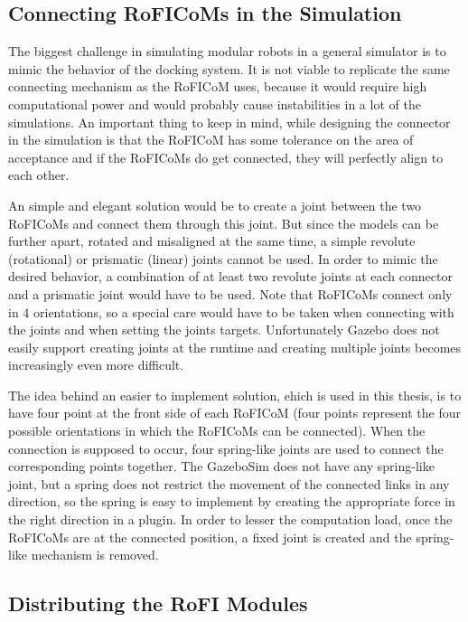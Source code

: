 \documentclass[
  digital, %
  table,   %
  oneside, %
  nolof,     %
  nolot,     %
]{fithesis3}
\begin{document}
\subsection{Connecting RoFICoMs in the Simulation}

The biggest challenge in simulating modular robots in a general simulator is to mimic the behavior of the docking system.
It is not viable to replicate the same connecting mechanism as the RoFICoM uses, because it would require high computational power and would probably cause instabilities in a lot of the simulations.
An important thing to keep in mind, while designing the connector in the simulation is that the RoFICoM has some tolerance\cite{roficom} on the area of acceptance and if the RoFICoMs do get connected, they will perfectly align to each other.

An simple and elegant solution would be to create a joint between the two RoFICoMs and connect them through this joint.
But since the models can be further apart, rotated and misaligned at the same time, a simple revolute (rotational) or prismatic (linear) joints cannot be used.
In order to mimic the desired behavior, a combination of at least two revolute joints at each connector and a prismatic joint would have to be used.
Note that RoFICoMs connect only in 4 orientations, so a special care would have to be taken when connecting with the joints and when setting the joints targets.
Unfortunately Gazebo does not easily support creating joints at the runtime and creating multiple joints becomes increasingly even more difficult.

The idea behind an easier to implement solution, ehich is used in this thesis, is to have four point at the front side of each RoFICoM (four points represent the four possible orientations in which the RoFICoMs can be connected).
When the connection is supposed to occur, four spring-like joints are used to connect the corresponding points together.
The GazeboSim does not have any spring-like joint, but a spring does not restrict the movement of the connected links in any direction, so the spring is easy to implement by creating the appropriate force in the right direction in a plugin.
In order to lesser the computation load, once the RoFICoMs are at the connected position, a fixed joint is created and the spring-like mechanism is removed.

\subsection{Distributing the RoFI Modules}
\end{document}
